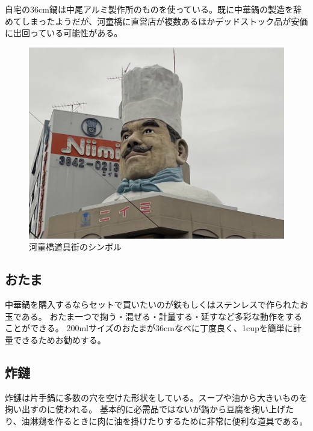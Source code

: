 \documentclass[a4paper,10pt,xelatex,ja=standard,twocolumn]{bxjsarticle}
\begin{document}
自宅の36cm鍋は中尾アルミ製作所のものを使っている。既に中華鍋の製造を辞めてしまったようだが、河童橋に直営店が複数あるほかデッドストック品が安価に出回っている可能性がある。

\begin{figure}[h]
  \caption{河童橋道具街のシンボル}
  \label{nabe1}
  \begin{center}
    \includegraphics[width=\linewidth]{IMG_4014.jpg}
  \end{center}
\end{figure}

\subsection{おたま}

中華鍋を購入するならセットで買いたいのが鉄もしくはステンレスで作られたお玉である。
おたま一つで掬う・混ぜる・計量する・延すなど多彩な動作をすることができる。
200mlサイズのおたまが36cmなべに丁度良く、1cupを簡単に計量できるためお勧めする。

\subsection{炸鏈}

炸鏈は片手鍋に多数の穴を空けた形状をしている。スープや油から大きいものを掬い出すのに使われる。
基本的に必需品ではないが鍋から豆腐を掬い上げたり、油淋鶏を作るときに肉に油を掛けたりするために非常に便利な道具である。
\end{document}
